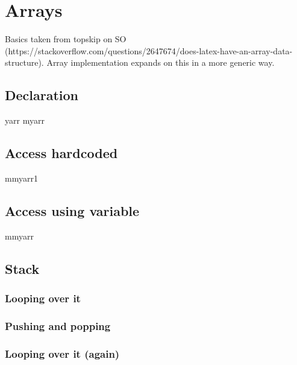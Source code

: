 \chapter{Arrays}

Basics taken from topskip on SO (https://stackoverflow.com/questions/2647674/does-latex-have-an-array-data-structure).
Array implementation expands on this in a more generic way.

\section{Declaration}
\setcounter{mycounter}{1}
\expandafter\newcommand\csname myarr\the\value{mycounter} 
\expandafter\newcommand\csname myarr\the\value{mycounter} 

\section{Access hardcoded}
\csname myarr1 \endcsname

\section{Access using variable}
\setcounter{index}{2}
\csname myarr\the\value{index} \endcsname

\section{Stack}


\subsection{Looping over it}

\subsection{Pushing and popping}





\subsection{Looping over it (again)}

